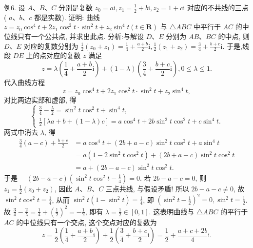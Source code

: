 例6. 设 $A 、 B 、 C$ 分别是复数 $z_0=a \mathrm{i}, z_1=\frac{1}{2}+b \mathrm{i}, z_2=1+c \mathrm{i}$ 对应的不共线的三点 ( $a 、 b 、 c$ 都是实数). 证明: 曲线 $z=z_0 \cos ^4 t+2 z_1 \cos ^2 t \cdot \sin ^2 t+ z_2 \sin ^4 t(t \in \mathbf{R})$ 与 $\triangle A B C$ 中平行于 $A C$ 的中位线只有一个公共点, 并求出此点.
分析:与解设 $D 、 E$ 分别为 $A B 、 B C$ 的中点, 则 $D 、 E$ 对应的复数分别为 $\frac{1}{2}\left(z_0+z_1\right)=\frac{1}{4}+\frac{a+b}{2} \mathrm{i}, \frac{1}{2}\left(z_1+z_2\right)=\frac{3}{4}+\frac{b+c}{2} \mathrm{i}$.
于是,线段 $D E$ 上的点对应的复数 $z$ 满足
$$
z=\lambda\left(\frac{1}{4}+\frac{a+b}{2} \mathrm{i}\right)+(1-\lambda)\left(\frac{3}{4}+\frac{b+c}{2} \mathrm{i}\right), 0 \leqslant \lambda \leqslant 1 .
$$
代入曲线方程
$$
z=z_0 \cos ^4 t+2 z_1 \cos ^2 t \cdot \sin ^2 t+z_2 \sin ^4 t,
$$
对比两边实部和虚部, 得
$$
\left\{\begin{array}{l}
\frac{3}{4}-\frac{\lambda}{2}=\sin ^2 t \cos ^2 t+\sin ^4 t, \\
\frac{1}{2}[\lambda a+b+(1-\lambda) c]=a \cos ^4 t+2 b \sin ^2 t \cos ^2 t+c \sin ^4 t .
\end{array}\right.
$$
两式中消去 $\lambda$, 得
$$
\begin{aligned}
\frac{3}{4}(a-c)+\frac{b+c}{2} & =a \cos ^4 t+(2 b+a-c) \sin ^2 t \cos ^2 t+a \sin ^4 t \\
& =a\left(1-2 \sin ^2 t \cos ^2 t\right)+(2 b+a-c) \sin ^2 t \cos ^2 t \\
& =a+(2 b-a-c) \sin ^2 t \cos ^2 t .
\end{aligned}
$$
于是 $\quad(2 b-a-c)\left(\sin ^2 t \cos ^2 t-\frac{1}{4}\right)=0$.
若 $2 b-a-c=0$, 则 $z_1=\frac{1}{2}\left(z_0+z_2\right)$, 因此 $A 、 B 、 C$ 三点共线, 与假设矛盾! 所以 $2 b-a-c \neq 0$, 故 $\sin ^2 t \cos ^2 t=\frac{1}{4}$, 从而 $\sin ^2 t\left(1-\sin ^2 t\right)=\frac{1}{4}$, 即 $\left(\sin ^2 t-\frac{1}{2}\right)^2=0, \sin ^2 t=\frac{1}{2}$.
故 $\frac{3}{4}-\frac{2}{\lambda}=\frac{1}{4}+\left(\frac{1}{2}\right)^2=-\frac{1}{2}$, 即有 $\lambda=\frac{1}{2} \in[0,1]$.
这表明曲线与 $\triangle A B C$ 的平行于 $A C$ 的中位线只有一个交点, 这个交点对应的复数为
$$
z=\frac{1}{2}\left(\frac{1}{4}+\frac{a+b}{2} \mathrm{i}\right)+\frac{1}{2}\left(\frac{3}{4}+\frac{b+c}{2} \mathrm{i}\right)=\frac{1}{2}+\frac{a+c+2 b}{4} \mathrm{i} .
$$



